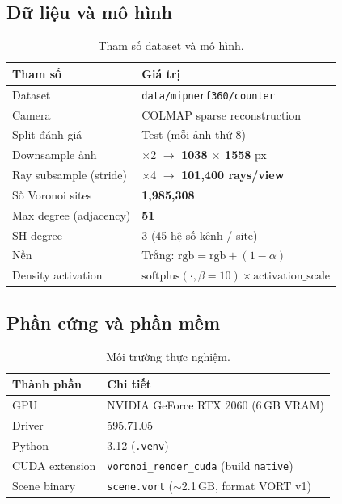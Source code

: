 \documentclass[11pt,a4paper]{article}
\begin{document}
\subsection{Dữ liệu và mô hình}

\begin{table}[H]
\centering
\caption{Tham số dataset và mô hình.}
\label{tab:setup-data}
\begin{tabular}{ll}
\toprule
\textbf{Tham số} & \textbf{Giá trị} \\
\midrule
Dataset & \texttt{data/mipnerf360/counter} \\
Camera & COLMAP sparse reconstruction \\
Split đánh giá & Test (mỗi ảnh thứ 8) \\
Downsample ảnh & $\times$2 $\rightarrow$ \textbf{1038 $\times$ 1558} px \\
Ray subsample (stride) & $\times$4 $\rightarrow$ \textbf{101,400 rays/view} \\
Số Voronoi sites & \textbf{1,985,308} \\
Max degree (adjacency) & \textbf{51} \\
SH degree & 3 (45 hệ số kênh / site) \\
Nền & Trắng: $\mathrm{rgb} = \mathrm{rgb} + (1 - \alpha)$ \\
Density activation & $\mathrm{softplus}(\cdot, \beta{=}10) \times \mathrm{activation\_scale}$ \\
\bottomrule
\end{tabular}
\end{table}

\subsection{Phần cứng và phần mềm}

\begin{table}[H]
\centering
\caption{Môi trường thực nghiệm.}
\label{tab:setup-hw}
\begin{tabular}{ll}
\toprule
\textbf{Thành phần} & \textbf{Chi tiết} \\
\midrule
GPU & NVIDIA GeForce RTX 2060 (6\,GB VRAM) \\
Driver & 595.71.05 \\
Python & 3.12 (\texttt{.venv}) \\
CUDA extension & \texttt{voronoi\_render\_cuda} (build \texttt{native}) \\
Scene binary & \texttt{scene.vort} ($\sim$2.1\,GB, format VORT v1) \\
\bottomrule
\end{tabular}
\end{table}
\end{document}
